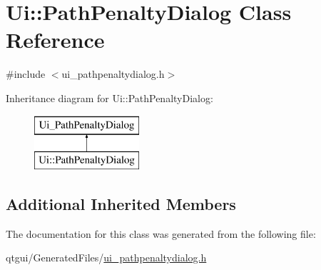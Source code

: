 \hypertarget{class_ui_1_1_path_penalty_dialog}{}\section{Ui\+::Path\+Penalty\+Dialog Class Reference}
\label{class_ui_1_1_path_penalty_dialog}


{\ttfamily \#include $<$ui\+\_\+pathpenaltydialog.\+h$>$}

Inheritance diagram for Ui\+::Path\+Penalty\+Dialog\+:\begin{figure}[H]
\begin{center}
\leavevmode
\includegraphics[height=2.000000cm]{d6/d44/class_ui_1_1_path_penalty_dialog}
\end{center}
\end{figure}
\subsection*{Additional Inherited Members}


The documentation for this class was generated from the following file\+:\begin{DoxyCompactItemize}
\item 
qtgui/\+Generated\+Files/\mbox{\hyperlink{ui__pathpenaltydialog_8h}{ui\+\_\+pathpenaltydialog.\+h}}\end{DoxyCompactItemize}
